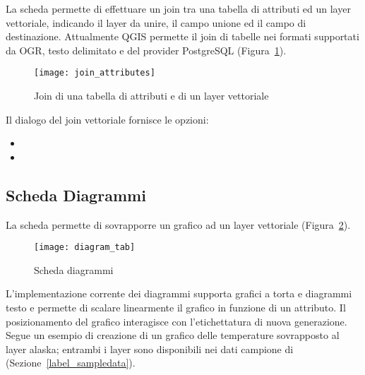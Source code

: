 La scheda  permette di effettuare un join tra una tabella di attributi ed 
un layer vettoriale, indicando il layer da unire, il campo unione ed il campo di destinazione.
Attualmente QGIS permette il join di tabelle nei formati supportati da OGR, testo delimitato 
e del provider PostgreSQL (Figura~\ref{fig:join_attributes}).

\begin{figure}[ht]
   \centering
   \texttt{[image: join\_attributes]}
   \caption{Join di una tabella di attributi e di un layer vettoriale \nixcaption}
   \label{fig:join_attributes}
\end{figure}

Il dialogo del join vettoriale fornisce le opzioni:

\begin{itemize}[label=--]
\item {}
\item {}
\end{itemize}

\subsection{Scheda Diagrammi}\label{sec:diagram}

La scheda  permette di sovrapporre un grafico ad un layer vettoriale (Figura~\ref{fig:diagramtab}).

\begin{figure}
   \centering
   \texttt{[image: diagram\_tab]}
   \caption{Scheda diagrammi \nixcaption}
   \label{fig:diagramtab}
\end{figure}

L'implementazione corrente dei diagrammi supporta grafici a torta e diagrammi testo e 
permette di scalare linearmente il grafico in funzione di un attributo.
Il posizionamento del grafico interagisce con l'etichettatura di nuova generazione. 
Segue un esempio di creazione di un grafico delle temperature
sovrapposto al layer alaska; entrambi i layer sono disponibili nei dati campione di \qg 
(Sezione~\ref{label_sampledata}).

